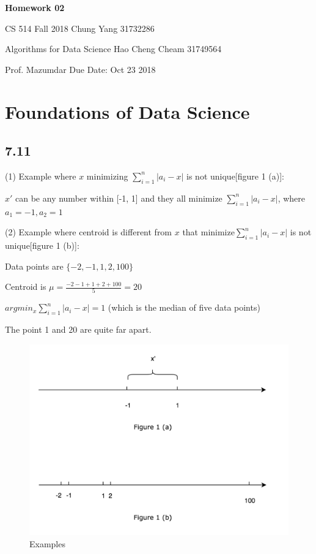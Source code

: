 \documentclass[a4paper, 11pt]{article}
\begin{document}
\noindent \large\textbf{Homework 02}

\normalsize CS 514 Fall 2018 \hfill Chung Yang 31732286

Algorithms for Data Science \hfill Hao Cheng Cheam 31749564



Prof. Mazumdar \hfill Due Date: Oct 23 2018 \\

\section*{Foundations of Data Science}

\subsection*{7.11}

(1) Example where $x$ minimizing $\sum_{i=1}^n |a_i - x|$ is not unique[figure 1 (a)]:


$x'$ can be any number within [-1, 1] and they all minimize $\sum_{i=1}^n |a_i - x|$, where $a_1 = -1, a_2 = 1$

(2) Example where centroid is different from $x$ that minimize$\sum_{i=1}^n |a_i - x|$ is not unique[figure 1 (b)]:

Data points are $\{-2, -1, 1, 2, 100 \}$

Centroid is $\mu = \frac{-2-1+1+2+100}{5} = 20$

$argmin_x  \sum_{i=1}^n |a_i - x| = 1$ (which is the median of five data points)

The point 1 and 20 are quite far apart.


\begin{figure}[htbp]
	\centering
	\includegraphics[scale=0.45]{figure1.png}
	\caption{Examples}
\end{figure}
\end{document}
